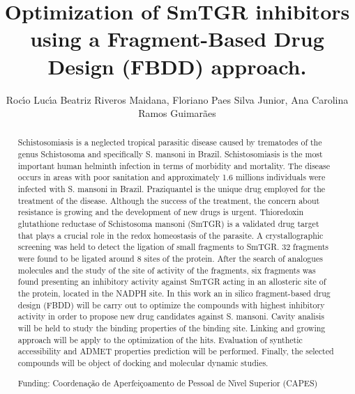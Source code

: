 \documentclass[twoside]{article}
\title{\vspace{-15mm}\fontsize{24pt}{10pt}\selectfont\textbf{ Optimization of SmTGR inhibitors using a Fragment-Based Drug Design (FBDD) approach. }} %
\author{ Roc\'{\i}o Luc\'{\i}a Beatriz Riveros Maidana, Floriano Paes Silva Junior, Ana Carolina Ramos Guimar\~aes }
\affil{ Laborat\'orio de Gen\^omica Funcional e Bioinform\'atica,  Instituto Oswaldo Cruz,  Funda\c{c}\~ao Oswaldo Cruz,  Rio de Janeiro,  Brazil }
\date{}
\begin{document}
  
  
  \maketitle %
  
  
  \thispagestyle{fancy} %
  
  
  \begin{abstract}
  Schistosomiasis is a neglected tropical parasitic disease caused by trematodes of the genus Schistosoma and specifically S. mansoni in Brazil. Schistosomiasis is the most important human helminth infection in terms of morbidity and mortality. The disease occurs in areas with poor sanitation and approximately 1.6 millions individuals were infected with S. mansoni in Brazil.  Praziquantel is the unique drug employed for the treatment of the disease. Although the success of the treatment,  the concern about resistance is growing and the development of new drugs is urgent. Thioredoxin glutathione reductase of Schistosoma mansoni (SmTGR) is a validated drug target that plays a crucial role in the redox homeostasis of the parasite. A crystallographic screening was held to detect the ligation of small fragments to SmTGR. 32 fragments were found to be ligated around 8 sites of the protein. After the search of analogues molecules and the study of the site of activity of the fragments,  six fragments was found presenting an inhibitory activity against SmTGR acting in an allosteric site of the protein,  located in the NADPH site. In this work an in silico fragment-based drug design (FBDD) will be carry out to optimize the compounds with highest inhibitory activity in order to propose new drug candidates against S. mansoni. Cavity analisis will be held to study the binding properties of the binding site. Linking and growing approach will be apply to the optimization of the hits. Evaluation of synthetic accessibility and ADMET properties prediction will be performed. Finally,  the selected compounds will be object of docking and molecular dynamic studies.
  
  Funding: Coordena\c{c}\~ao de Aperfei\c{c}oamento de Pessoal de N\'{\i}vel Superior (CAPES) \\ 
  \end{abstract}
  
\end{document}
